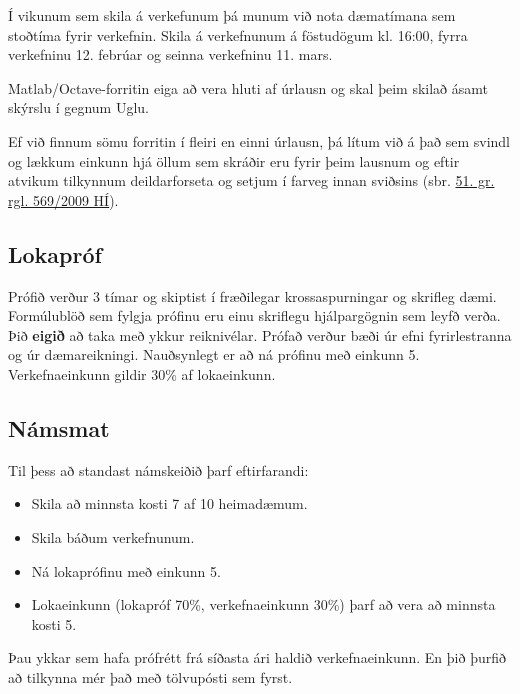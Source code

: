 \documentclass[A4paper,10pt,icelandic]{sphinxmanual}
\begin{document}
Í vikunum sem skila á verkefunum þá munum við nota dæmatímana sem stoðtíma fyrir verkefnin. Skila á verkefnunum á föstudögum kl. 16:00, fyrra verkefninu 12. febrúar og seinna verkefninu 11. mars.

Matlab/Octave-forritin eiga að vera hluti af úrlausn og skal þeim skilað ásamt skýrslu í gegnum Uglu.

Ef við finnum sömu forritin í fleiri en einni úrlausn, þá lítum við á það sem svindl og lækkum einkunn hjá öllum sem skráðir eru fyrir þeim lausnum og eftir atvikum tilkynnum deildarforseta og setjum í farveg innan sviðsins (sbr. \href{http://www.hi.is/adalvefur/reglur\_fyrir\_haskola\_islands\#51}{51. gr. rgl. 569/2009 HÍ}).


\subsection{Lokapróf}
\label{vidauki:lokaprof}
Prófið verður 3 tímar og skiptist í fræðilegar krossaspurningar og skrifleg dæmi. Formúlublöð sem fylgja prófinu eru einu
skriflegu hjálpargögnin sem leyfð verða.  Þið \textbf{eigið} að taka með ykkur reiknivélar. Prófað verður bæði úr efni fyrirlestranna og úr dæmareikningi. Nauðsynlegt er að ná prófinu með einkunn 5.  Verkefnaeinkunn gildir
30\% af lokaeinkunn.


\subsection{Námsmat}
\label{vidauki:namsmat}
Til þess að standast námskeiðið þarf eftirfarandi:
\begin{itemize}
\item {} 
Skila að minnsta kosti 7 af 10 heimadæmum.

\item {} 
Skila báðum verkefnunum.

\item {} 
Ná lokaprófinu með einkunn 5.

\item {} 
Lokaeinkunn (lokapróf 70\%, verkefnaeinkunn 30\%) þarf að vera að minnsta kosti 5.

\end{itemize}

Þau ykkar sem hafa prófrétt frá síðasta ári haldið verkefnaeinkunn. En þið þurfið að tilkynna mér það með tölvupósti sem fyrst.

\newpage
\end{document}
